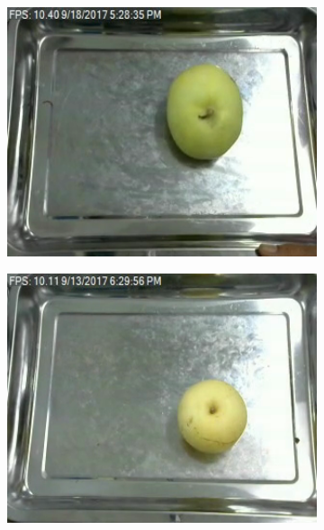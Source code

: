 \documentclass[a4,german]{article}
\begin{document}
\begin{figure}[b]
\begin{subfigure}[c]{0.19\textwidth}
\includegraphics[width=1\textwidth]{Muskmelon_11.png}
\subcaption{}
\end{subfigure}
\begin{subfigure}[c]{0.19\textwidth}
\includegraphics[width=1\textwidth]{Pear_8.png}
\subcaption{}
\end{subfigure}
\begin{subfigure}[c]{0.19\textwidth}

\end{subfigure}
\end{figure}
\end{document}

